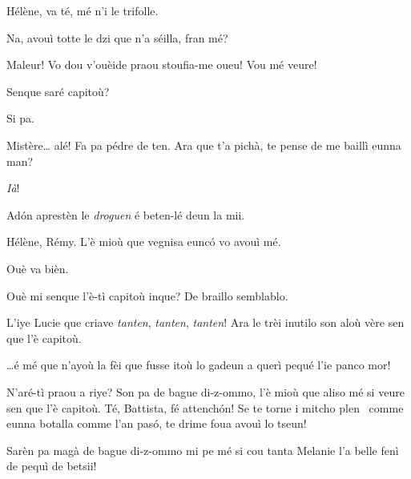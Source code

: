 \begin{drama}
\Remyspeaks Hélène, va té, mé n'i le trifolle.

\Helenespeaks Na, avouì totte le dzi que n'a séilla, fran mé?

\Cesarspeaks{} Maleur! Vo dou v'ouèide praou stoufia-me oueu! Vou mé veure!


\Hermannspeaks{} Senque saré capitoù?

\Peterspeaks Si pa.

\Hermannspeaks Mistère\ldots {} alé! Fa pa pédre de ten. Ara que t'a pichà, te pense de me baillì eunna man?

\Peterspeaks \textit{Ià}!

\Hermannspeaks Ad\'on aprestèn le \textit{droguen} é beten-lé deun la mii.



\Cesarspeaks{} Hélène, Rémy. L'è mioù que vegnisa eunc\'o vo avouì mé.

\Remyspeaks Ouè va bièn.




\Germainespeaks Ouè mi senque l’è-tì capitoù inque? De braillo semblablo. 

\Hermannspeaks L'iye Lucie que criave \textit{tanten}, \textit{tanten}, \textit{tanten}! Ara le trèi inutilo son aloù vère sen que l'è capitoù.

\Battistaspeaks  \ldots é mé que n’ayoù la fèi que fusse itoù lo gadeun a querì pequé l’ie panco mor!


\Germainespeaks N’aré-tì praou a riye? Son pa de bague di-z-ommo, l'è mioù que aliso mé si veure sen que l’è capitoù. Té, Battista, fé attench\'on! Se te torne i mitcho plen \pion\ comme eunna botalla comme l'an pas\'o, te drime foua avouì lo tseun! 


\Battistaspeaks  Sarèn pa magà de bague di-z-ommo mi pe mé si cou tanta Melanie l’a belle fenì de pequì de betsii! 


\end{drama}
